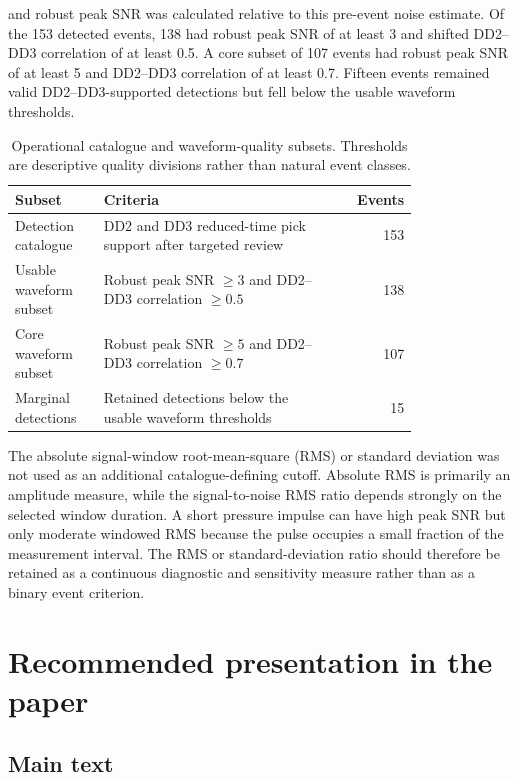 \documentclass[11pt]{article}
\begin{document}
and robust peak SNR was calculated relative to this pre-event noise estimate.
Of the 153 detected events, 138 had robust peak SNR of at least 3 and shifted
DD2--DD3 correlation of at least 0.5. A core subset of 107 events had robust
peak SNR of at least 5 and DD2--DD3 correlation of at least 0.7. Fifteen
events remained valid DD2--DD3-supported detections but fell below the usable
waveform thresholds.

\begin{table}[htbp]
\centering
\caption{Operational catalogue and waveform-quality subsets. Thresholds are
descriptive quality divisions rather than natural event classes.}
\label{tab:quality_subsets}
\begin{tabular}{p{0.22\linewidth}p{0.58\linewidth}r}
\toprule
Subset & Criteria & Events \\
\midrule
Detection catalogue & DD2 and DD3 reduced-time pick support after targeted review & 153 \\
Usable waveform subset & Robust peak SNR $\geq 3$ and DD2--DD3 correlation $\geq 0.5$ & 138 \\
Core waveform subset & Robust peak SNR $\geq 5$ and DD2--DD3 correlation $\geq 0.7$ & 107 \\
Marginal detections & Retained detections below the usable waveform thresholds & 15 \\
\bottomrule
\end{tabular}
\end{table}

The absolute signal-window root-mean-square (RMS) or standard deviation was
not used as an additional catalogue-defining cutoff. Absolute RMS is primarily
an amplitude measure, while the signal-to-noise RMS ratio depends strongly on
the selected window duration. A short pressure impulse can have high peak SNR
but only moderate windowed RMS because the pulse occupies a small fraction of
the measurement interval. The RMS or standard-deviation ratio should therefore
be retained as a continuous diagnostic and sensitivity measure rather than as
a binary event criterion.

\section{Recommended presentation in the paper}

\subsection{Main text}
\end{document}
